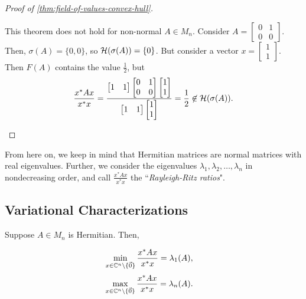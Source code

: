 \begin{proof}[Proof of \ref{thm:field-of-values-convex-hull}]
\begin{example}
This theorem does not hold for non-normal $A \in M_n$. Consider $A = \begin{bmatrix}0 & 1 \\ 0 & 0\end{bmatrix}$. Then, $\sigma(A) = \{0, 0\}$, so $\mathcal{H}(\sigma(A)) = \{0\}$. But consider a vector $x = \begin{bmatrix}1 \\ 1 \end{bmatrix}$. Then $F(A)$ contains the value $\frac{1}{2}$, but
$$
\frac{x^* A x}{x^*x} 
    = \frac{
            \begin{bmatrix}1 & 1\end{bmatrix} 
            \begin{bmatrix}0 & 1 \\ 0 & 0\end{bmatrix}
            \begin{bmatrix}1 \\ 1\end{bmatrix}
        }
        {
            \begin{bmatrix}1 & 1\end{bmatrix}
            \begin{bmatrix}1 \\ 1\end{bmatrix}
        }
    = \frac12 \not \in \mathcal{H}(\sigma(A)).
$$
\end{example}
\end{proof}

\noindent From here on, we keep in mind that Hermitian matrices are normal matrices with real eigenvalues. Further, we consider the eigenvalues $\lambda_1, \lambda_2, \dots, \lambda_n$ in nondecreasing order, and call $\frac{x^*Ax}{x^*x}$ the ``\textit{Rayleigh-Ritz ratios}".

\clearpage 

\subsection{Variational Characterizations}

\begin{theorem}
\label{thm:Rayleigh-Ritz}
Suppose $A \in M_n$ is Hermitian. Then,
\begin{multicols}{2}
\noindent \begin{align*}
    \min_{x \in \mathbb C^n \setminus \{\Vec{0}\}} \frac{x^*Ax}{x^*x} &= \lambda_1(A),
\end{align*}
\begin{align*}
    \max_{x \in \mathbb C^n \setminus \{\Vec{0}\}} \frac{x^*Ax}{x^*x} &= \lambda_n(A).
\end{align*}
\end{multicols}
\end{theorem}

